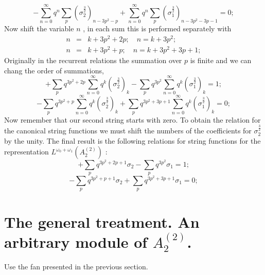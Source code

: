 \documentclass{article}
\begin{document}
\begin{equation*}
-\sum_{n=0}^{\infty }q^{n}\sum_{p}\left( \sigma _{2}^{\frac{3}{2}}\right)
_{n-3p^{2}-p}+\sum_{n=0}^{\infty }q^{n}\sum_{p}\left( \sigma _{1}^{\frac{3}{2%
}}\right) _{n-3p^{2}-3p-1}=0;
\end{equation*}
Now shift the variable $n$ , in each sum this is performed separately with
\begin{eqnarray*}
n &=&k+3p^{2}+2p;\quad n=k+3p^{2}; \\
n &=&k+3p^{2}+p;\quad n=k+3p^{2}+3p+1;
\end{eqnarray*}
Originally in the recurrent relations the summation over $p$ is finite and
we can chang the order of summations,
\begin{equation*}
+\sum_{p}q^{3p^{2}+2p}\sum_{n=0}^{\infty }q^{k}\left( \sigma _{2}^{\frac{3}{2%
}}\right) _{k}-\sum_{p}q^{3p^{2}}\sum_{n=0}^{\infty }q^{k}\left( \sigma
_{1}^{\frac{3}{2}}\right) _{k}=1;
\end{equation*}
\begin{equation*}
-\sum_{p}q^{3p^{2}+p}\sum_{n=0}^{\infty }q^{k}\left( \sigma _{2}^{\frac{3}{2}%
}\right) _{k}+\sum_{p}q^{3p^{2}+3p+1}\sum_{n=0}^{\infty }q^{k}\left( \sigma
_{1}^{\frac{3}{2}}\right) _{k}=0;
\end{equation*}
Now remember that our second string starts with zero. To obtain the relation
for the canonical string functions we must shift the numbers of the
coefficients for $\sigma _{2}^{\frac{3}{2}}$ by the unity. The final result
is the following relations for string functions for the representation $%
L^{\omega _{0}+\omega _{1}}(A_{2}^{\left( 2\right) })$ :
\begin{equation*}
+\sum_{p}q^{3p^{2}+2p+1}\sigma _{2}-\sum_{p}q^{3p^{2}}\sigma _{1}=1;
\end{equation*}
\begin{equation*}
-\sum_{p}q^{3p^{2}+p+1}\sigma _{2}+\sum_{p}q^{3p^{2}+3p+1}\sigma _{1}=0;
\end{equation*}

\section{The general treatment. An arbitrary module of $A_{2}^{\left(
2\right) }$.}

Use the fan presented in the previous section.
\end{document}
